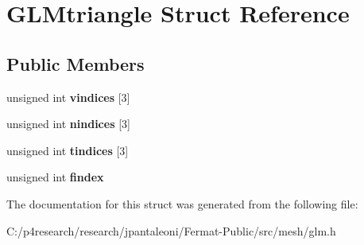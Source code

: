 \hypertarget{struct_g_l_mtriangle}{}\section{G\+L\+Mtriangle Struct Reference}
\label{struct_g_l_mtriangle}
\subsection*{Public Members}
\begin{DoxyCompactItemize}
\item 
\mbox{\label{struct_g_l_mtriangle_a9eac9ebe99f6c128917f1ddae3e5c03a}} 
unsigned int {\bfseries vindices} \mbox{[}3\mbox{]}
\item 
\mbox{\label{struct_g_l_mtriangle_a73988670d69b586f161d224229d77730}} 
unsigned int {\bfseries nindices} \mbox{[}3\mbox{]}
\item 
\mbox{\label{struct_g_l_mtriangle_a91ee800ced2bb95b257aa2efe79125fb}} 
unsigned int {\bfseries tindices} \mbox{[}3\mbox{]}
\item 
\mbox{\label{struct_g_l_mtriangle_a97a38e64b9b5d4f569f967065bddf377}} 
unsigned int {\bfseries findex}
\end{DoxyCompactItemize}


The documentation for this struct was generated from the following file\+:\begin{DoxyCompactItemize}
\item 
C\+:/p4research/research/jpantaleoni/\+Fermat-\/\+Public/src/mesh/glm.\+h\end{DoxyCompactItemize}
